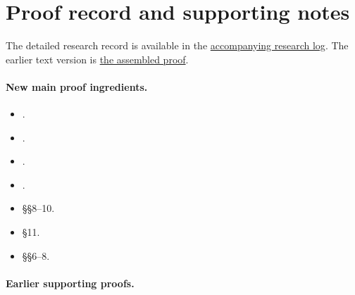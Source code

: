 \documentclass[11pt,a4paper]{article}
\theoremstyle{remark}
\begin{document}
\section*{Proof record and supporting notes}

The detailed research record is available in the \href{https://chatgpt.com/library?file_id=libfile_f10d80492b688191970c625ab3952096&account_id=personal}{accompanying research log}. The earlier text version is \href{https://chatgpt.com/library?file_id=libfile_7338a158ba3c8191a7b47b1688ce2dd5&account_id=personal}{the assembled proof}.

\paragraph{New main proof ingredients.}

\begin{itemize}[nosep]

\item {}.

\item {}.

\item {}.

\item {}.

\item {} \S\S8--10.

\item {} \S11.

\item {} \S\S6--8.

\end{itemize}

\paragraph{Earlier supporting proofs.}
\end{document}
